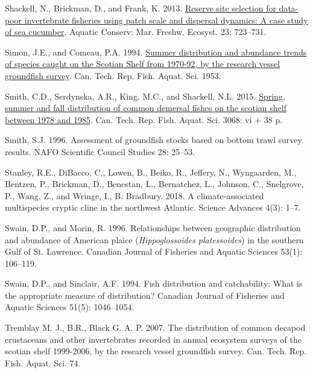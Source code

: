 \documentclass[12pt]{article}\usepackage[]{graphicx}\usepackage[]{color}
\begin{document}
\leavevmode\hypertarget{ref-Shackell2013}{}%
Shackell, N., Brickman, D., and Frank, K. 2013. \href{https://onlinelibrary.wiley.com/doi/full/10.1002/aqc.2369}{Reserve site selection for data-poor invertebrate fisheries using patch scale and dispersal dynamics: A case study of sea cucumber}. Aquatic Conserv: Mar. Freshw. Ecosyst. 23: 723--731.

\leavevmode\hypertarget{ref-Simon:Comeau:1994}{}%
Simon, J.E., and Comeau, P.A. 1994. \href{http://publications.gc.ca/site/eng/46517/publication.html}{Summer distribution and abundance trends of species caught on the Scotian Shelf from 1970-92, by the research vessel groundfish survey}. Can. Tech. Rep. Fish. Aquat. Sci. 1953.

\leavevmode\hypertarget{ref-Smith2015}{}%
Smith, C.D., Serdynska, A.R., King, M.C., and Shackell, N.L. 2015. \href{https://waves-vagues.dfo-mpo.gc.ca/Library/358735.pdf}{Spring, summer and fall distribution of common demersal fishes on the scotian shelf between 1978 and 1985}. Can. Tech. Rep. Fish. Aquat. Sci. 3068: vi + 38 p.

\leavevmode\hypertarget{ref-Smith:1996}{}%
Smith, S.J. 1996. Assessment of groundfish stocks based on bottom trawl survey results. NAFO Scientific Council Studies 28: 25--53.

\leavevmode\hypertarget{ref-Stanley:2018}{}%
Stanley, R.E., DiBacco, C., Lowen, B., Beiko, R., Jeffery, N., Wyngaarden, M., Bentzen, P., Brickman, D., Benestan, L., Bernatchez, L., Johnson, C., Snelgrove, P., Wang, Z., and Wringe, I., B. Bradbury. 2018. A climate-associated multispecies cryptic cline in the northwest Atlantic. Science Advances 4(3): 1--7.

\leavevmode\hypertarget{ref-Swain:Morin:1996:cjfas}{}%
Swain, D.P., and Morin, R. 1996. Relationships between geographic distribution and abundance of American plaice (\emph{Hippoglossoides platessoides}) in the southern Gulf of St. Lawrence. Canadian Journal of Fisheries and Aquatic Sciences 53(1): 106--119.

\leavevmode\hypertarget{ref-Swain:Sinclair:1994:cjfas}{}%
Swain, D.P., and Sinclair, A.F. 1994. Fish distribution and catchability: What is the appropriate measure of distribution? Canadian Journal of Fisheries and Aquatic Sciences 51(5): 1046--1054.

\leavevmode\hypertarget{ref-Tremblayetal:2007}{}%
Tremblay M. J., B.R., Black G. A. P. 2007. The distribution of common decapod crustaceans and other invertebrates recorded in annual ecosystem surveys of the scotian shelf 1999-2006, by the research vessel groundfish survey. Can. Tech. Rep. Fish. Aquat. Sci. 74.
\end{document}
